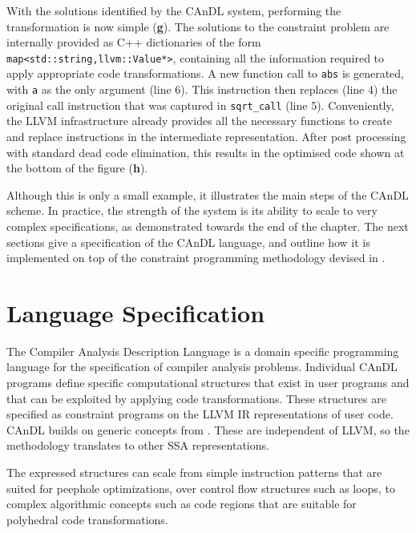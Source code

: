     With the solutions identified by the CAnDL system, performing the
    transformation is now simple ({\bf g}).
    The solutions to the constraint problem are internally provided as C++
    dictionaries of the form \texttt{map<std::string,llvm::Value*>},
    containing all the information required to apply appropriate code
    transformations.
    A new function call to \texttt{abs} is generated, with \texttt{a} as the
    only argument (line 6).
    This instruction then replaces (line 4) the original call instruction that
    was captured in \texttt{sqrt\_call} (line 5).
    Conveniently, the LLVM infrastructure already provides all the necessary
    functions to create and replace instructions in the intermediate
    representation.
    After post processing with standard dead code elimination, this results in
    the optimised code shown at the bottom of the figure ({\bf h}).

    Although this is only a small example, it illustrates the main steps of the
    CAnDL scheme.
    In practice, the strength of the system is its ability to scale to very
    complex specifications, as demonstrated towards the end of the chapter.
    The next sections give a specification of the CAnDL language, and outline
    how it is implemented on top of the constraint programming methodology
    devised in .

\begin{figure}[p]
    
    \label{fig:candlexample}
\end{figure}

\section{Language Specification}

    The Compiler Analysis Description Language is a domain specific
    programming language for the specification of compiler analysis problems. 
    Individual CAnDL programs define specific computational structures that
    exist in user programs and that can be exploited by applying code
    transformations.
    These structures are specified as constraint programs on the LLVM IR
    representations of user code.
    CAnDL builds on generic concepts from .
    These are independent of LLVM, so the methodology translates to other SSA
    representations.

    The expressed structures can scale from simple instruction patterns that are
    suited for peephole optimizations, over control flow structures such
    as loops, to complex algorithmic concepts such as code regions that are
    suitable for polyhedral code transformations.

